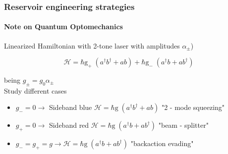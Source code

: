 \documentclass[aspectratio=43]{beamer}
\begin{document}
\begin{frame}
	
	\frametitle{Reservoir engineering strategies}
	\framesubtitle{Note on Quantum Optomechanics}
	
	Linearized Hamiltonian with 2-tone laser with amplitudes $\alpha_{\pm}$)
	
	\begin{equation}
	\mathcal{H} = \hbar \textrm{g}_{+} \; (a^{\dagger}b^{\dagger} + ab) + \hbar \textrm{g}_{-} \; (a^{\dagger}b + ab^{\dagger}) \nonumber
	\end{equation}
	
	being $g_{\pm} = g_{0} \alpha_{\pm}$ \\
	Study different cases
	
	\begin{itemize}
		\item $g_{-} = 0 \longrightarrow$ Sideband blue $\mathcal{H} = \hbar \textrm{g} \; (a^{\dagger}b^{\dagger} + ab)$ "2 - mode squeezing"
		\item $g_{+} = 0 \longrightarrow$ Sideband red $\mathcal{H} = \hbar \textrm{g} \; (a^{\dagger}b + ab^{\dagger})$ "beam - splitter"
		\item $g_{-} = g_{+} = g \longrightarrow \mathcal{H} = \hbar \textrm{g} \; (a^{\dagger}b + ab^{\dagger})$ "backaction evading"
	\end{itemize}	

\end{frame}
\end{document}
